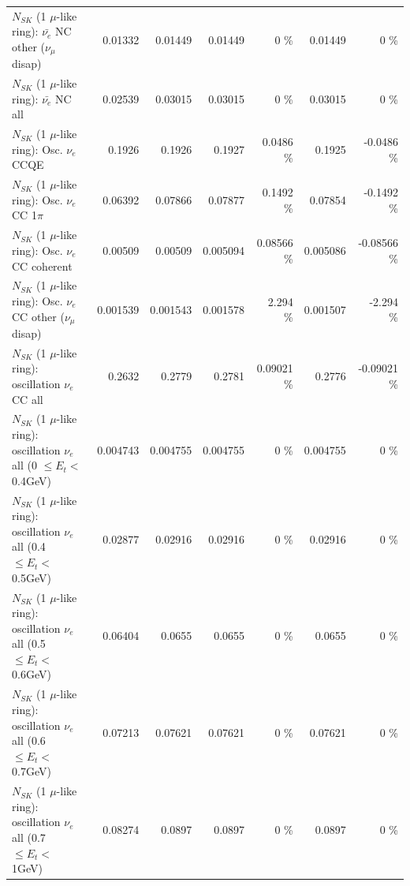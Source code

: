 \begin{table}
\begin{tabular}{| l | r | r | r  r | r  r |}
          $N_{SK}$ (1 $\mu$-like ring): $\bar{\nu_e}$ NC other ($\nu_\mu$ disap) &         0.01332 &         0.01449 &         0.01449 &        0 \%  &         0.01449 &        0 \%  \\ 
                            $N_{SK}$ (1 $\mu$-like ring): $\bar{\nu_{e}}$ NC all &         0.02539 &         0.03015 &         0.03015 &        0 \%  &         0.03015 &        0 \%  \\ 
\hline
\hline
\hline
                                 $N_{SK}$ (1 $\mu$-like ring): Osc. $\nu_e$ CCQE &          0.1926 &          0.1926 &          0.1927 &   0.0486 \%  &          0.1925 &  -0.0486 \%  \\ 
                            $N_{SK}$ (1 $\mu$-like ring): Osc. $\nu_e$ CC 1$\pi$ &         0.06392 &         0.07866 &         0.07877 &   0.1492 \%  &         0.07854 &  -0.1492 \%  \\ 
                          $N_{SK}$ (1 $\mu$-like ring): Osc. $\nu_e$ CC coherent &         0.00509 &         0.00509 &        0.005094 &  0.08566 \%  &        0.005086 & -0.08566 \%  \\ 
           $N_{SK}$ (1 $\mu$-like ring): Osc. $\nu_e$ CC other ($\nu_\mu$ disap) &        0.001539 &        0.001543 &        0.001578 &    2.294 \%  &        0.001507 &   -2.294 \%  \\ 
                        $N_{SK}$ (1 $\mu$-like ring): oscillation $\nu_e$ CC all &          0.2632 &          0.2779 &          0.2781 &  0.09021 \%  &          0.2776 & -0.09021 \%  \\ 
\hline
$N_{SK}$ (1 $\mu$-like ring): oscillation $\nu_{e}$ all (0 $\leq E_{t} <$ 0.4GeV) &        0.004743 &        0.004755 &        0.004755 &        0 \%  &        0.004755 &        0 \%  \\ 
$N_{SK}$ (1 $\mu$-like ring): oscillation $\nu_{e}$ all (0.4 $\leq E_{t} <$ 0.5GeV) &         0.02877 &         0.02916 &         0.02916 &        0 \%  &         0.02916 &        0 \%  \\ 
$N_{SK}$ (1 $\mu$-like ring): oscillation $\nu_{e}$ all (0.5 $\leq E_{t} <$ 0.6GeV) &         0.06404 &          0.0655 &          0.0655 &        0 \%  &          0.0655 &        0 \%  \\ 
$N_{SK}$ (1 $\mu$-like ring): oscillation $\nu_{e}$ all (0.6 $\leq E_{t} <$ 0.7GeV) &         0.07213 &         0.07621 &         0.07621 &        0 \%  &         0.07621 &        0 \%  \\ 
$N_{SK}$ (1 $\mu$-like ring): oscillation $\nu_{e}$ all (0.7 $\leq E_{t} <$ 1GeV) &         0.08274 &          0.0897 &          0.0897 &        0 \%  &          0.0897 &        0 \%  \\ 

\end{tabular}
\end{table}
